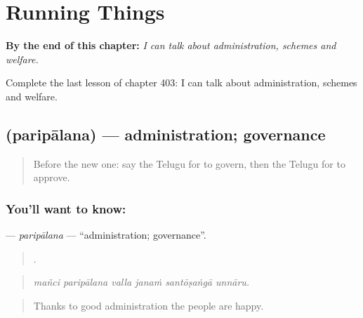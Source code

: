 
\chapter{Running Things}
\label{ch:te-running-things}

\begin{chapteropening}
\textbf{By the end of this chapter:} \emph{I can talk about administration, schemes and welfare.}

Complete the last lesson of chapter 403: I can talk about administration, schemes and welfare.
\end{chapteropening}

\section[\texorpdfstring{\te{పరిపాలన} (paripālana)}{పరిపాలన (paripālana)}]{ (paripālana) — administration; governance}

\label{lesson:TE-C403-paripalana}



\begin{quote}
Before the new one: say the Telugu for to govern, then the Telugu for to approve.
\end{quote}

\subsection*{You'll want to know: }
\textbf{} — \emph{paripālana} — \textquotedblleft{}administration; governance\textquotedblright{}.

\begin{quote}
     .
\end{quote}

\begin{quote}
\emph{mañci paripālana valla janaṁ santōṣaṅgā unnāru.}
\end{quote}

\begin{quote}
Thanks to good administration the people are happy.
\end{quote}

